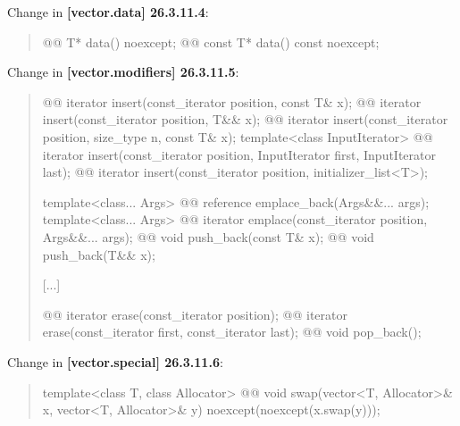 \documentclass{wg21}
\begin{document}
Change in \textbf{[vector.data] 26.3.11.4}:
\begin{quote}
\begin{itemdecl}
@@ T*         data() noexcept;
@@ const T*   data() const noexcept;
\end{itemdecl}
\end{quote}

Change in \textbf{[vector.modifiers] 26.3.11.5}:
\begin{quote}
\begin{itemdecl}
@@ iterator insert(const_iterator position, const T& x);
@@ iterator insert(const_iterator position, T&& x);
@@ iterator insert(const_iterator position, size_type n, const T& x);
template<class InputIterator>
  @@ iterator insert(const_iterator position, InputIterator first, InputIterator last);
@@ iterator insert(const_iterator position, initializer_list<T>);

template<class... Args> @@ reference emplace_back(Args&&... args);
template<class... Args> @@ iterator emplace(const_iterator position, Args&&... args);
@@ void push_back(const T& x);
@@ void push_back(T&& x);
\end{itemdecl}
[...]
\begin{itemdecl}
@@ iterator erase(const_iterator position);
@@ iterator erase(const_iterator first, const_iterator last);
@@ void pop_back();
\end{itemdecl}
\end{quote}

Change in \textbf{[vector.special] 26.3.11.6}:
\begin{quote}
\begin{itemdecl}
template<class T, class Allocator>
  @@ void swap(vector<T, Allocator>& x, vector<T, Allocator>& y)
    noexcept(noexcept(x.swap(y)));
\end{itemdecl}
\end{quote}
\end{document}
